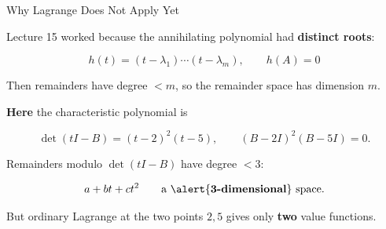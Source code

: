 \documentclass[10pt]{beamer}
\theoremstyle{definition}
\newcommand{\x}[1]{\alert{\textbf{#1}}}
\begin{document}
\begin{frame}[shrink=5]{Why Lagrange Does Not Apply Yet}

Lecture 15 worked because the annihilating polynomial had \x{distinct roots}:

$$h(t) = (t-\lambda_1)\cdots(t-\lambda_m), \qquad h(A)=0$$

\vfill

Then remainders have degree $<m$, so the remainder space has dimension $m$.

\vfill

\x{Here} the characteristic polynomial is

$$\det(tI - B) = (t-2)^2(t-5), \qquad (B-2I)^2(B-5I)=0.$$

\vfill

Remainders modulo $\det(tI - B)$ have degree $<3$:

$$a + bt + ct^2 \qquad \text{a \x{3-dimensional} space.}$$

\vfill

But ordinary Lagrange at the two points $2,5$ gives only \x{two} value functions.

\vfill

\begin{center}
\end{center}

\end{frame}
\end{document}
